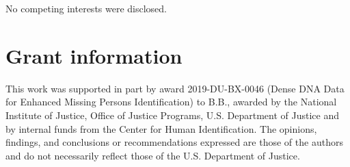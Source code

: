 \documentclass[9pt,a4paper,]{extarticle}
\begin{document}
No competing interests were disclosed.

\hypertarget{grant-information}{%
\section{Grant information}\label{grant-information}}

This work was supported in part by award 2019-DU-BX-0046 (Dense DNA Data for Enhanced Missing Persons Identification) to B.B., awarded by the National Institute of Justice, Office of Justice Programs, U.S. Department of Justice and by internal funds from the Center for Human Identification. The opinions, findings, and conclusions or recommendations expressed are those of the authors and do not necessarily reflect those of the U.S. Department of Justice.

{\small}
\end{document}
